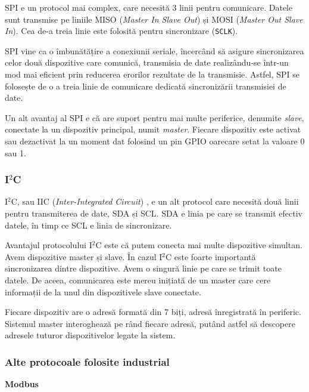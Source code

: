 SPI e un protocol mai complex, care necesită 3 linii pentru comunicare. Datele
sunt transmise pe liniile MISO (\textit{Master In
Slave Out}) și MOSI  (\textit{Master Out Slave In}). Cea
de-a treia linie este folosită pentru sincronizare (\texttt{SCLK}).

SPI vine ca o îmbunătățire a conexiunii seriale, încercând să asigure
sincronizarea celor două dispozitive care comunică, transmisia de date
realizându-se într-un mod mai eficient prin reducerea erorilor rezultate de la
transmisie. Astfel, SPI se folosește de o a treia linie de comunicare dedicată
sincronizării transmisiei de date.

Un alt avantaj al SPI e că are suport pentru mai multe periferice, denumite \textit{slave},
conectate la un dispozitiv principal, numit \textit{master}. Fiecare dispozitiv este
activat sau dezactivat la un moment dat folosind un pin GPIO oarecare setat la
valoare 0 sau 1.

\subsubsection{I$^2$C}
\label{sec:embed:bus:wired:i2c}

I$^2$C, sau IIC (\textit{Inter-Integrated Circuit}) , e un
alt protocol care necesită două linii pentru transmiterea de date, SDA și SCL.
SDA e linia pe care se transmit efectiv datele, în timp ce SCL e linia de
sincronizare.

Avantajul protocolului I$^2$C este că putem conecta mai multe dispozitive simultan.
Avem dispozitive master și slave. În cazul I$^2$C este foarte importantă
sincronizarea dintre dispozitive. Avem o singură linie pe care se trimit toate
datele. De aceea, comunicarea este mereu inițiată de un master care cere
informații de la unul din dispozitivele slave conectate.

Fiecare dispozitiv are o adresă formată din 7 biți, adresă înregistrată în
periferic. Sistemul master interoghează pe rând fiecare adresă, putând astfel să
descopere adresele tuturor dispozitivelor legate la sistem.

\subsubsection{Alte protocoale folosite industrial}
\label{sec:embed:bus:wired:other}

\textbf{Modbus}

